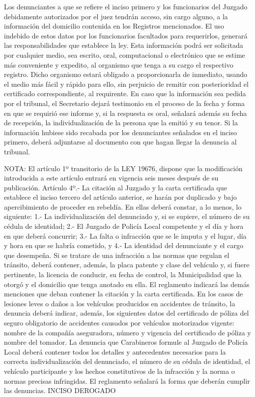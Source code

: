     Los denunciantes a que se refiere el inciso primero y los funcionarios del Juzgado debidamente autorizados por el juez tendrán acceso, sin cargo alguno, a la información del domicilio contenida en los Registros mencionados. El uso indebido de estos datos por los funcionarios facultados para requerirlos, generará las responsabilidades que establece la ley.
    Esta información podrá ser solicitada por cualquier medio, sea escrito, oral, computacional o electrónico que se estime más conveniente y expedito, al organismo que tenga a su cargo el respectivo registro. Dicho organismo estará obligado a proporcionarla de inmediato, usando el medio más fácil y rápido para ello, sin perjuicio de remitir con posterioridad el certificado correspondiente, al requirente.
    En caso que la información sea pedida por el tribunal, el Secretario dejará testimonio en el proceso de la fecha y forma en que se requirió ese informe y, si la respuesta es oral, señalará además su fecha de recepción, la individualización de la persona que la emitió y su tenor. Si la información hubiese sido recabada por los denunciantes señalados en el inciso primero, deberá adjuntarse al documento con que hagan llegar la denuncia al tribunal.





NOTA:
    El artículo 1º transitorio de la LEY 19676, dispone que la modificación introducida a este artículo entrará en vigencia seis meses después de su publicación.
    Artículo 4º.- La citación al Juzgado y la carta certificada que establece el inciso tercero del artículo anterior, se harán por duplicado y bajo apercibimiento de proceder en rebeldía. En ellas deberá constar, a lo menos, lo siguiente:
    1.- La individualización del denunciado y, si se supiere, el número de su cédula de identidad;
    2.-  El Juzgado de Policía Local competente y el día y hora en que deberá concurrir;
    3.- La falta o infracción que se le imputa y el lugar, día y hora en que se habría cometido, y 4.- La identidad del denunciante y el cargo que desempeña.
    Si se tratare de una infracción a las normas que regulan el tránsito, deberá contener, además, la placa patente y clase del vehículo y, si fuere pertinente, la licencia de conducir, su fecha de control, la Municipalidad que la otorgó y el domicilio que tenga anotado en ella.
    El reglamento indicará las demás menciones que deban contener la citación y la carta certificada.
    En los casos de lesiones leves o daños a los vehículos producidos en accidentes de tránsito, la denuncia deberá indicar, además, los siguientes datos del certificado de póliza del seguro obligatorio de accidentes causados por vehículos motorizados vigente: nombre de la compañía aseguradora, número y vigencia del certificado de póliza y nombre del tomador.
    La denuncia que Carabineros formule al Juzgado de Policía Local deberá contener todos los detalles y antecedentes necesarios para la correcta individualización del denunciado, el número de su cédula de identidad, el vehículo participante y los hechos constitutivos de la infracción y la norma o normas precisas infringidas. El reglamento señalará la forma que deberán cumplir las denuncias.
    INCISO DEROGADO

